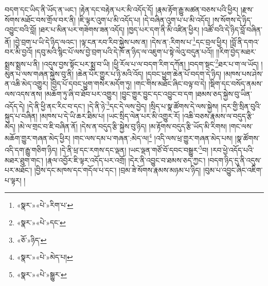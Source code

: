བདག་དང་ཡིད་ནི་ཡོད་ན་ཡང་། །རྟེན་དང་བརྟེན་པར་མི་འདོད་དོ། །རྣམ་རྟོག་རྒྱུ་མཚན་བཅས་པའི་ཕྱིར། །རྫས་སོགས་མཐོང་བས་གྲོལ་བར་ནི། །ཇི་ལྟར་འུག་པ་མི་འདོད་པ། །དེ་བཞིན་འུག་པ་པ་མི་འདོད། །ས་སོགས་དེ་ཉིད་འབྱུང་བའི་བློ། །ཐར་པ་མིན་པར་གཟེགས་ཟན་འདོད། །ཁྱད་པར་དག་ནི་མི་འཛིན་ཕྱིར། །འཚོ་བའི་དེ་ཉིད་བློ་བཞིན་ནོ། །བྱེ་བྲག་པ་ཡི་དེ་ཉིད་ལའང་། །ལྟ་ངན་རབ་རིབ་སྐྱེས་པས་ན། །དེས་ན་:རིགས་པ་\footnote{«སྣར་»«པེ་»རིག་པ་}དང་བྲལ་ཕྱིར། །བློ་ནི་དགའ་བར་མི་བྱའོ། །དབུ་མའི་སྙིང་པོ་ལས་བྱེ་བྲག་པའི་དེ་ཁོ་ན་ཉིད་ལ་འཇུག་པ་སྟེ་ལེའུ་བདུན་པའོ།། །།རིག་བྱེད་མཐར་སྨྲས་སྨྲས་པ་ནི། །འདུས་བྱས་སྟོང་པར་སྨྲ་བ་ཡི། །ཕྱི་རོལ་པ་ལ་བདག་རིག་དཀོན། །བདག་སྡང་\footnote{«སྣར་»«པེ་»དང་}ཐར་པ་ག་ལ་ཡོད། །མུན་པ་ལས་གཞན་སྐྱེས་བུ་ནི། །ཆེན་པོར་གྱུར་པ་ཉི་མའི་འོད། །དབང་ཕྱུག་ཆེན་པོ་བདག་དེ་ཉིད། །མཁས་པས་ཤེས་ན་འཆི་མེད་འགྱུར། །བྱེད་པོ་དབང་ཕྱུག་གསེར་མདོག་ཏུ། །གང་གིས་མཐོང་ཞིང་བལྟ་བ་དེ། །སྡིག་དང་བསོད་ནམས་ལས་འདས་ནས། །མཆོག་ཏུ་ཞི་བ་ཐོབ་པར་འགྱུར། །བྱུང་གྱུར་བྱུང་དང་འབྱུང་བ་དག །ཐམས་ཅད་སྐྱེས་བུ་ཡིན་འདོད་དེ། །དེ་ནི་ཕྱི་ནང་རིང་བ་དང་། །དེ་ནི་ཉེ་\footnote{«ཅོ་»ཉིད་}དང་དེ་ལས་བྱེད། །སྲིད་པ་སྣ་ཚོགས་དེ་ལས་སྐྱེས། །དར་གྱི་སྲིན་བུའི་སྐུད་པ་བཞིན། །མཁས་པ་དེ་ཡི་ཆར་ཐིམ་པ། །ཡང་སྲིད་ལེན་པར་མི་འགྱུར་རོ། །འཆི་བཅས་རྣམས་ལ་བདུད་རྩི་མེད། །མེ་ལ་གྲང་བ་ཇི་བཞིན་ནོ། །དེས་ན་བདུད་རྩི་སྐྱེས་བུ་ཉིད། །མ་རྟོགས་བདུད་རྩི་ཡོད་མི་རིགས། །གང་ལས་མཆོག་གྱུར་གཞན་མེད་ཕྱིར། །གང་ལས་དམ་པ་གཞན་:མེད་ལ།\footnote{«སྣར་»«པེ་»མེད་པ།} །འདི་ལས་ཕྲ་གྱུར་གཞན་མེད་པས། །སྣ་ཚོགས་འདི་དག་རྒྱུ་གཅིག་ཉིད། །དེ་ནི་ཕྲ་དང་རགས་དང་ལྡན། །ཡང་ལྡན་གཙོ་བོ་དབང་བསྒྱུར་\footnote{«སྣར་»«པེ་»སྒྱུར་}བ། །རབ་ཕྱེ་འདོད་པའི་མཐར་ཐུག་གང་། །རྣལ་འབྱོར་ཇི་ལྟར་འདོད་པར་འགྲོ། །དེར་ནི་འབྱུང་བ་ཐམས་ཅད་ཀྱང་། །བདག་ཉིད་དུ་ནི་འདུས་པར་མཐོང་། །བྱིས་དང་མཁས་དང་གདོལ་པ་དང་། །བྲམ་ཟེ་སོགས་རྣམས་མཉམ་པ་ཉིད། །བུམ་པ་འབྱུང་ཞིང་འཇིག་པ་ལྟར། །
